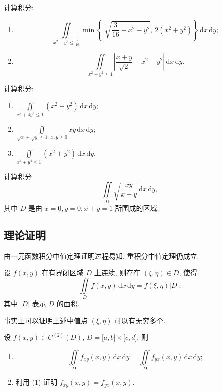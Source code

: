 \documentclass[../../数学分析培优讲义.tex]{subfiles}
\begin{document}
\begin{example}
计算积分:
\begin{enumerate}[label=(\arabic*)]
    \item
    \[
        \iint\limits_{x^2+y^2\leq\frac{3}{16}}
        \min\left\{\sqrt[3]{\dfrac{3}{16}-x^2-y^2},\ 2(x^2+y^2)\right\}\,\mathrm{d}x\,\mathrm{d}y;
    \]
    \item
    \[
        \iint\limits_{x^2+y^2\leq1}\left|\dfrac{x+y}{\sqrt{2}}-x^2-y^2\right|\,\mathrm{d}x\,\mathrm{d}y.
    \]
\end{enumerate}
\end{example}
\exampleblank

\begin{example}
计算积分:
\begin{enumerate}[label=(\arabic*)]
    \item $\displaystyle\iint\limits_{x^2+4y^2\leq1}(x^2+y^2)\,\mathrm{d}x\,\mathrm{d}y$;
    \item $\displaystyle\iint\limits_{\sqrt{x}+\sqrt{y}\leq1,\ x,y\geq0}xy\,\mathrm{d}x\,\mathrm{d}y$;
    \item $\displaystyle\iint\limits_{x^4+y^4\leq1}(x^2+y^2)\,\mathrm{d}x\,\mathrm{d}y$.
\end{enumerate}
\end{example}
\exampleblank

\begin{example}
计算积分
\[
    \iint\limits_D\sqrt{\dfrac{xy}{x+y}}\,\mathrm{d}x\,\mathrm{d}y,
\]
其中 $D$ 是由 $x=0,y=0,x+y=1$ 所围成的区域.
\end{example}
\exampleblank



\subsection{理论证明}

由一元函数积分中值定理证明过程易知, 重积分中值定理仍成立.

\begin{theorem}[\markstar]
设 $f(x,y)$ 在有界闭区域 $D$ 上连续, 则存在 $(\xi,\eta)\in D$, 使得
\[
    \iint\limits_Df(x,y)\,\mathrm{d}x\,\mathrm{d}y=f(\xi,\eta)|D|.
\]
其中 $|D|$ 表示 $D$ 的面积.
\end{theorem}

\begin{remark}
事实上可以证明上述中值点 $(\xi,\eta)$ 可以有无穷多个.
\end{remark}

\begin{example}
设 $f(x,y)\in C^{(2)}(D)$, $D=\lbrack a,b\rbrack\times\lbrack c,d\rbrack$, 则
\begin{enumerate}[label=(\arabic*)]
    \item
    \[
        \iint\limits_D f_{xy}(x,y)\,\mathrm{d}x\,\mathrm{d}y
        =\iint\limits_D f_{yx}(x,y)\,\mathrm{d}x\,\mathrm{d}y;
    \]
    \item 利用 (1) 证明 $f_{xy}(x,y)=f_{yx}(x,y)$.
\end{enumerate}
\end{example}
\exampleblank
\end{document}
